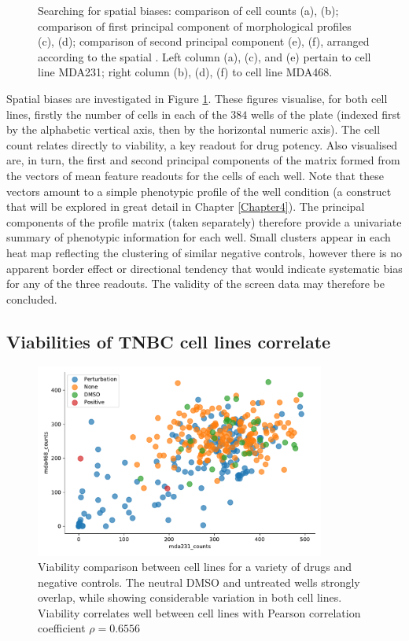 \begin{figure}
    \caption{Searching for spatial biases: comparison of cell counts (a), (b); comparison of first principal component of morphological profiles (c), (d); comparison of second principal component (e), (f), arranged according to the spatial . Left column (a), (c), and (e) pertain to cell line MDA231; right column (b), (d), (f) to cell line MDA468.}%
    \label{fig:plateeffects}%
\end{figure}

Spatial biases are investigated in Figure \ref{fig:plateeffects}. These figures visualise, for both cell lines, firstly the number of cells in each of the $384$ wells of the plate (indexed first by the alphabetic vertical axis, then by the horizontal numeric axis). The cell count relates directly to viability, a key readout for drug potency. Also visualised are, in turn, the first and second principal components of the matrix formed from the vectors of mean feature readouts for the cells of each well. Note that these vectors amount to a simple phenotypic profile of the well condition (a construct that will be explored in great detail in Chapter \ref{Chapter4}). The principal components of the profile matrix (taken separately) therefore provide a univariate summary of phenotypic information for each well. Small clusters appear in each heat map reflecting the clustering of similar negative controls, however there is no apparent border effect or directional tendency that would indicate systematic bias for any of the three readouts. The validity of the screen data may therefore be concluded.

\subsection{Viabilities of TNBC cell lines correlate}
\label{subsec:viability}

\begin{figure}
\centering
\includegraphics[width=0.85\textwidth]{img/viability.pdf}
\caption{Viability comparison between cell lines for a variety of drugs and negative controls. The neutral DMSO and untreated wells strongly overlap, while showing considerable variation in both cell lines. Viability correlates well between cell lines with Pearson correlation coefficient $\rho = 0.6556$}
\label{fig:viability}
\end{figure}

